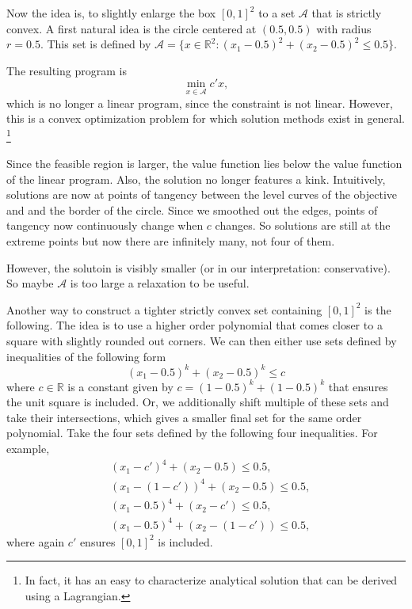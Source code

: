 \documentclass[11pt,a4paper,english]{article} %
\numberwithin{equation}{section}
\numberwithin{figure}{section}
\numberwithin{table}{section}
\theoremstyle{definition}
\theoremstyle{remark}
\begin{document}
Now the idea is, to slightly enlarge the box $[0,1]^2$ to a set $\mathcal{A}$ that is strictly convex.
A first natural idea is the circle centered at $(0.5, 0.5)$ with radius $r=0.5$.
This set is defined by $\mathcal{A} = \{x \in \mathbb{R}^2: (x_1 - 0.5)^2 + (x_2 - 0.5)^2 \leq 0.5\}$.

The resulting program is
\begin{equation}
	\min_{x\in\mathcal{A}} c'x,
\end{equation}
which is no longer a linear program, since the constraint is not linear.
However, this is a convex optimization problem for which solution methods exist in general.
\footnote{In fact, it has an easy to characterize analytical solution that can be derived using a Lagrangian.}

Since the feasible region is larger, the value function lies below the value function of the linear program.
Also, the solution no longer features a kink.
Intuitively, solutions are now at points of tangency between the level curves of the objective and and the border of the circle.
Since we smoothed out the edges, points of tangency now continuously change when $c$ changes.
So solutions are still at the extreme points but now there are infinitely many, not four of them.

However, the solutoin is visibly smaller (or in our interpretation: conservative).
So maybe $\mathcal{A}$ is too large a relaxation to be useful.

Another way to construct a tighter strictly convex set containing $[0,1]^2$ is the following.
The idea is to use a higher order polynomial that comes closer to a square with slightly rounded out corners.
We can then either use sets defined by inequalities of the following form
\begin{equation*}
	(x_1-0.5)^k + (x_2-0.5)^k \leq c
\end{equation*}
where $c\in\mathbb{R}$ is a constant given by $c = (1-0.5)^k + (1-0.5)^k$ that ensures the unit square is included.
Or, we additionally shift multiple of these sets and take their intersections, which gives a smaller final set for the same order polynomial.
Take the four sets defined by the following four inequalities. For example,
\begin{align}
	& (x_1 - c')^4 + (x_2 - 0.5) \leq 0.5, \\
	& (x_1 - (1-c'))^4 + (x_2 - 0.5) \leq 0.5, \\
	& (x_1 - 0.5)^4 + (x_2 - c') \leq 0.5, \\
	& (x_1 - 0.5)^4 + (x_2 - (1-c')) \leq 0.5,
\end{align}
where again $c'$ ensures $[0,1]^2$ is included.
\end{document}
